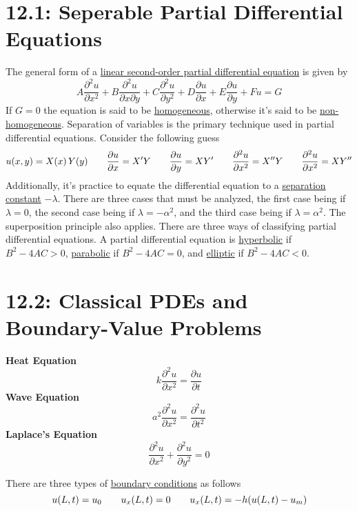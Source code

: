 \documentclass{article}
\begin{document}
\section*{12.1: Seperable Partial Differential Equations}
The general form of a \underline{linear second-order partial differential equation} is given by
\[A\frac{\partial^2u}{\partial x^2}+B\frac{\partial^2u}{\partial x\partial y}+C\frac{\partial^2u}{\partial y^2}+D\frac{\partial u}{\partial x}+E\frac{\partial u}{\partial y}+Fu=G\]
If \(G=0\) the equation is said to be \underline{homogeneous}, otherwise it's said to be \underline{non-homogeneous}. Separation of variables is the primary technique used in partial differential equations. Consider the following guess
\[u(x,y)=X(x)\,Y(y)\hspace{7 mm}\frac{\partial u}{\partial x}=X'Y\hspace{7 mm}\frac{\partial u}{\partial y}=XY'\hspace{7 mm}\frac{\partial^2u}{\partial x^2}=X''Y\hspace{7 mm}\frac{\partial^2u}{\partial x^2}=XY''\]
Additionally, it's practice to equate the differential equation to a \underline{separation constant} \(-\lambda\). There are three cases that must be analyzed, the first case being if \(\lambda=0\), the second case being if \(\lambda=-\alpha^2\), and the third case being if \(\lambda=\alpha^2\). The superposition principle also applies.
\newline
\newline
There are three ways of classifying partial differential equations. A partial differential equation is \underline{hyperbolic} if \(B^2-4AC>0\), \underline{parabolic} if \(B^2-4AC=0\), and \underline{elliptic} if \(B^2-4AC<0\).
\section*{12.2: Classical PDEs and Boundary-Value Problems}
\begin{center}
\begin{multicols}{3}
    \textbf{Heat Equation}
    \[k\frac{\partial^2u}{\partial x^2}=\frac{\partial u}{\partial t}\]
    \textbf{Wave Equation}
    \[a^2\frac{\partial^2 u}{\partial x^2}=\frac{\partial^2 u}{\partial t^2}\]
    \textbf{Laplace's Equation}
    \[\frac{\partial^2u}{\partial x^2}+\frac{\partial^2u}{\partial y^2}=0\]
\end{multicols}
\end{center}
\vspace{5 mm}
There are three types of \underline{boundary conditions} as follows
\[u(L, t)=u_0\hspace{7 mm}u_x(L, t)=0\hspace{7 mm}u_x(L, t)=-h(u(L, t)-u_m)\]
\end{document}
